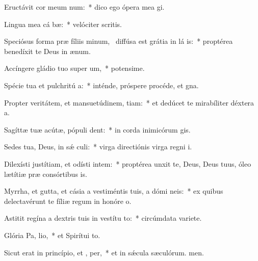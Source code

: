 \item Eructávit cor meum  num:~* dico ego ópera mea gi.
\item Lingua mea cá bæ:~* velóciter scritis.
\item Speciósus forma præ fíliis minum,~\pscross{} diffúsa est grátia in lá is:~* proptérea benedíxit te Deus in ænum.
\item Accíngere gládio tuo super  um,~* potensime.
\item Spécie tua et pulchritú a:~* inténde, próspere procéde, et gna.
\item Propter veritátem, et mansuetúdinem,  tiam:~* et dedúcet te mirabíliter déxtera a.
\item Sagíttæ tuæ acútæ, pópuli   dent:~* in corda inimicórum gis.
\item Sedes tua, Deus, in sǽ culi:~* virga directiónis virga regni i.
\item Dilexísti justítiam, et odísti intem:~* proptérea unxit te, Deus, Deus tuus, óleo lætítiæ præ consórtibus is.
\item Myrrha, et gutta, et cásia a vestiméntis tuis, a dómi neis:~* ex quibus delectavérunt te fíliæ regum in honóre o.
\item Astitit regína a dextris tuis in vestítu to:~* circúmdata variete.
\item Glória Pa,  lio,~* et Spirítui to.
\item Sicut erat in princípio, et ,  per,~* et in sǽcula sæculórum. men.
